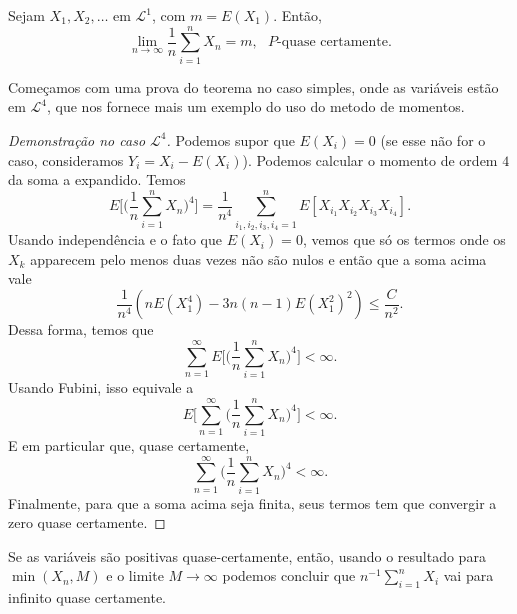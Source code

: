 \begin{theorem}
  \label{t:LFGN}
  Sejam $X_1, X_2, \dots$ \iid em $\mathcal{L}^1$, com $m = E(X_1)$.
  Então,
  \begin{equation}
    \lim_{n \to \infty} \frac{1}{n} \sum_{i=1}^n X_n = m, \text{ $P$-quase certamente.}
  \end{equation}
\end{theorem}

Começamos com uma prova do teorema no caso simples, onde as variáveis estão em $\mathcal L^4$, que nos fornece mais um exemplo do uso do metodo de momentos.

\begin{proof}[Demonstração no caso $\mathcal L^4$]
Podemos supor que $E(X_i) = 0$ (se esse não for o caso, consideramos $Y_i = X_i - E(X_i)$).
Podemos calcular o momento de ordem $4$ da soma a expandido.
Temos
\begin{equation*}
  E \bigg[ \bigg(\frac{1}{n} \sum_{i=1}^n X_n \bigg)^4 \Bigg]
  = \frac{1}{n^4} \sum_{i_1,i_2,i_3,i_4=1}^n
  E[X_{i_1}X_{i_2}X_{i_3}X_{i_4}].
\end{equation*}
Usando independência e o fato que $E(X_i) = 0$, vemos que só os termos onde os $X_{k}$ apparecem pelo menos duas vezes não são nulos e
então que a soma acima vale
$$\frac{1}{n^4}\left( n E(X^4_1) - 3n(n-1) E(X^2_1)^2 \right)\le \frac{C}{n^2}.$$
Dessa forma, temos que
\begin{equation}
  \sum_{n=1}^{\infty} E \bigg[
  \Big(\frac{1}{n} \sum_{i=1}^n X_n \Big)^4
  \bigg] < \infty.
\end{equation}
Usando Fubini, isso equivale a
\begin{equation}
 E \bigg[  \sum_{n=1}^{\infty} \bigg(\frac{1}{n} \sum_{i=1}^n X_n \bigg)^4 \bigg]<\infty.
\end{equation}
E em particular que, quase certamente,
\begin{equation}
  \sum_{n=1}^{\infty} \bigg(\frac{1}{n} \sum_{i=1}^n X_n \bigg)^4
  < \infty.
\end{equation}
Finalmente, para que a soma acima seja finita, seus termos tem que convergir a zero quase certamente.
\end{proof}

\begin{remark}
  Se as variáveis são positivas quase-certamente, então, usando o resultado para $\min(X_n,M)$ e o limite $M\to \infty$ podemos concluir que $n^{-1}\sum_{i=1}^n X_i$ vai para infinito quase certamente.
\end{remark}

